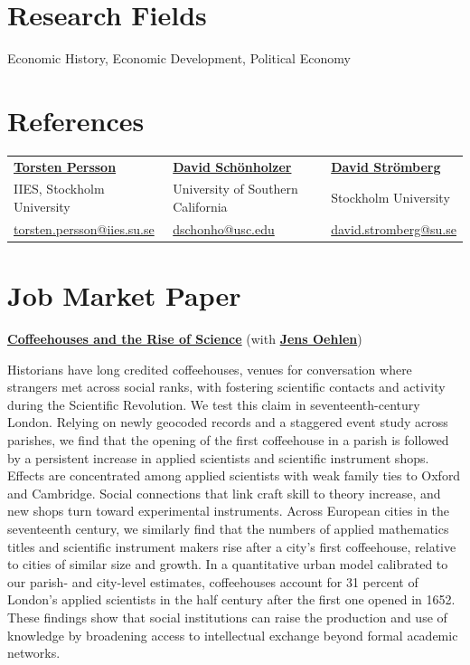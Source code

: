 \documentclass[a4paper]{article}
\newcommand{\paperentry}[3]{%
  \noindent\textbf{#1} #2\par
  \vspace{2pt}
  {#3\par}
}
\begin{document}
\section*{Research Fields}

Economic History, Economic Development, Political Economy

\section*{References}

{\setlength{\tabcolsep}{4pt}
\begin{tabular}{@{}>{\raggedright\arraybackslash}p{}>{\raggedright\arraybackslash}p{}>{\raggedright\arraybackslash}p{}@{}}
\href{https://www.su.se/english/profiles/t/tpers}{\textbf{Torsten Persson}} & \href{https://dornsife.usc.edu/profile/david-schonholzer/}{\textbf{David Sch\"{o}nholzer}} & \href{https://www.su.se/english/profiles/d/dstro}{\textbf{David Str\"{o}mberg}} \\
IIES, Stockholm University & University of Southern California & Stockholm University \\
\href{mailto:torsten.persson@iies.su.se}{torsten.persson@iies.su.se} & \href{mailto:dschonho@usc.edu}{dschonho@usc.edu} & \href{mailto:david.stromberg@su.se}{david.stromberg@su.se}
\end{tabular}}

\section*{Job Market Paper}

\paperentry
{\href{https://www.monirbounadi.com/Bounadi_JMP.pdf}{Coffeehouses and the Rise of Science}}
{(with \href{https://jensoehlen.github.io/}{\textbf{Jens Oehlen}})}
{Historians have long credited coffeehouses, venues for conversation where strangers met across social ranks, with fostering scientific contacts and activity during the Scientific Revolution. We test this claim in seventeenth-century London. Relying on newly geocoded records and a staggered event study across parishes, we find that the opening of the first coffeehouse in a parish is followed by a persistent increase in applied scientists and scientific instrument shops. Effects are concentrated among applied scientists with weak family ties to Oxford and Cambridge. Social connections that link craft skill to theory increase, and new shops turn toward experimental instruments. Across European cities in the seventeenth century, we similarly find that the numbers of applied mathematics titles and scientific instrument makers rise after a city's first coffeehouse, relative to cities of similar size and growth. In a quantitative urban model calibrated to our parish- and city-level estimates, coffeehouses account for 31 percent of London's applied scientists in the half century after the first one opened in 1652. These findings show that social institutions can raise the production and use of knowledge by broadening access to intellectual exchange beyond formal academic networks.}
\end{document}
